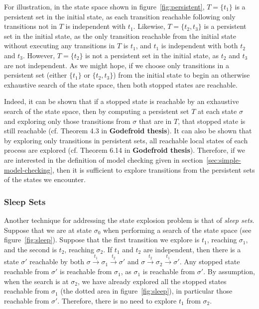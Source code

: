 \documentclass[12pt,a4paper,twoside,openright]{report}
\begin{document}
For illustration, in the state space shown in
figure~\ref{fig:persistent}, $T = \{t_1\}$ is
a persistent set in the initial state, as each
transition reachable following only transitions
not in $T$ is independent with $t_1$.
Likewise, $T = \{t_2, t_3\}$ is
a persistent set in the initial state, as the
only transition reachable from the initial state
without executing any transitions in $T$ is $t_1$,
and $t_1$ is independent with both $t_2$ and $t_3$.
However, $T = \{t_2\}$ is not a persistent set in the
initial state, as $t_2$ and $t_3$ are not independent.
As we might hope, if we choose only transitions
in a persistent set (either $\{t_1\}$ or $\{t_2, t_3\}$)
from the initial state to begin
an otherwise exhaustive search of the state space, then
both stopped states are reachable.

Indeed, it can be shown that if a stopped state is reachable by an exhaustive
search of the state space, then by computing a persistent set $T$ at
each state $\sigma$ and exploring only those transitions from
$\sigma$ that are in $T$, that stopped state is still reachable
(cf. Theorem 4.3 in \textbf{Godefroid thesis}). It can also be shown
that by exploring only transitions in persistent sets, all reachable
local states of each process are explored (cf. Theorem 6.14 in
\textbf{Godefroid thesis}). Therefore, if we are interested in
the definition of model checking given in 
section~\ref{sec:simple-model-checking}, then it is sufficient
to explore transitions from the persistent sets of the states we
encounter.

\subsubsection{Sleep Sets}

Another technique for addressing the state explosion
problem is that of \emph{sleep sets}. Suppose that
we are at state $\sigma_0$ when performing a search
of the state space (see figure~\ref{fig:sleep}).
Suppose that the first transition
we explore is $t_1$, reaching $\sigma_1$,
and the second is $t_2$, reaching $\sigma_2$.
If $t_1$ and $t_2$ are independent, then there
is a state $\sigma'$ reachable by both
$\sigma \xrightarrow{t_1} \sigma_1
\xrightarrow{t_2} \sigma'$ and
$\sigma \xrightarrow{t_2} \sigma_2
\xrightarrow{t_1} \sigma'$.
Any stopped state reachable from $\sigma'$
is reachable from $\sigma_1$, as $\sigma_1$
is reachable from $\sigma'$. By assumption,
when the search is at $\sigma_2$, we have already
explored all the stopped states reachable from
$\sigma_1$ (the dotted area in figure~\ref{fig:sleep}),
in particular those reachable from
$\sigma'$. Therefore, there is no need to
explore $t_1$ from $\sigma_2$.
\end{document}
